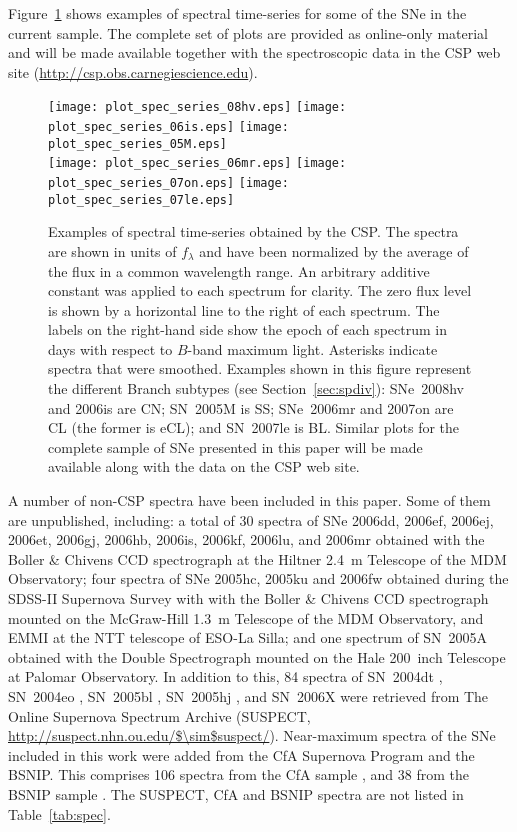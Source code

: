 \documentclass[apj]{emulateapj-rtx4}
\begin{document}
Figure~\ref{fig:spec} shows examples of spectral
time-series for some of the SNe in the current sample. The complete
set of plots are provided as online-only material and will be
made available together with the spectroscopic data in the CSP web
site (\url{http://csp.obs.carnegiescience.edu}). 

\begin{figure}[htpb]%
\texttt{[image: plot\_spec\_series\_08hv.eps]}
\texttt{[image: plot\_spec\_series\_06is.eps]}
\texttt{[image: plot\_spec\_series\_05M.eps]}\\
\texttt{[image: plot\_spec\_series\_06mr.eps]}
\texttt{[image: plot\_spec\_series\_07on.eps]}
\texttt{[image: plot\_spec\_series\_07le.eps]}
\caption{Examples of spectral time-series obtained by the CSP. The
  spectra are shown in units of $f_\lambda$ and have been normalized
  by the average of the flux in a common wavelength range. An
  arbitrary additive constant was applied to each spectrum for
  clarity. The zero flux level is shown by a horizontal line to the
  right of each spectrum. The labels on the right-hand side show the
  epoch of each spectrum in days with respect to $B$-band maximum
  light. Asterisks indicate spectra that were smoothed. Examples shown
  in this figure represent the different Branch subtypes (see
  Section~\ref{sec:spdiv}): SNe~2008hv and 2006is are CN; SN~2005M is
  SS; SNe~2006mr and 2007on are CL (the former is eCL); and SN~2007le
  is BL. Similar plots for the complete sample of SNe presented in
  this paper will be made available along with the data on the CSP web
  site. 
\label{fig:spec}}
\end{figure}

A number of non-CSP spectra have been included in this paper. 
Some of them are unpublished, including: a total of 30 spectra of
  SNe 2006dd, 2006ef, 2006ej, 2006et, 
2006gj, 2006hb, 2006is, 2006kf, 2006lu, and 2006mr obtained with the
Boller \& Chivens CCD spectrograph at the Hiltner 2.4~m Telescope of
the MDM Observatory; four spectra of SNe 2005hc, 2005ku and 2006fw
obtained during the SDSS-II Supernova Survey \citep{frieman08} with
with the Boller \& Chivens 
CCD spectrograph mounted on the McGraw-Hill 1.3~m Telescope of the MDM
Observatory, and EMMI at the NTT telescope of ESO-La Silla; and one
spectrum of SN~2005A obtained with the 
Double Spectrograph \citep[DBSP;][]{oke82} mounted on the Hale 200~inch
Telescope at Palomar Observatory. In addition to this, 84 spectra of
SN~2004dt \citep{altavilla07}, SN~2004eo \citep{pastorello07}, SN~2005bl
\citep{taubenberger08}, 
SN~2005hj \citep{quimby07}, and SN~2006X \citep{wang08,yamanaka09}
were retrieved from The Online Supernova Spectrum Archive 
(SUSPECT, \url{http://suspect.nhn.ou.edu/$\sim$suspect/}). 
Near-maximum spectra of the SNe included in this work were added
from the CfA Supernova Program and the BSNIP. This comprises
106 spectra from the CfA sample \citep{blondin12}, and 38
from the BSNIP sample \citep{silverman12a}.
The SUSPECT, CfA and BSNIP spectra are not listed in Table~\ref{tab:spec}.
\end{document}
